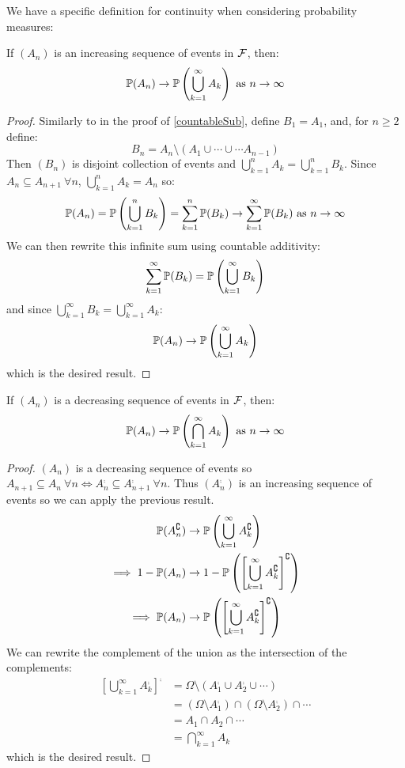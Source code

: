 \documentclass[../main.tex]{subfiles}
\begin{document}
We have a specific definition for continuity when considering probability measures:
\begin{proposition}
  If $(A_n)$ is an increasing sequence of events in $\salg$, then:
  \[
    \P(A_n) \to \P\left(\bigcup_{k = 1}^{\infty} A_k\right) \text{ as $n \to \infty$}
  \]
\end{proposition}
\begin{proof}
  Similarly to in the proof of \cref{countableSub}, define $B_1 = A_1$, and, for $n \geq 2$ define:
  \[
    B_n = A_n \setminus (A_1 \cup \cdots \cup \cdots A_{n - 1})
  \]
  Then $(B_n)$ is disjoint collection of events and $\bigcup_{k = 1}^{n} A_k = \bigcup_{k = 1}^{n} B_k$.
  Since $A_n \subseteq A_{n + 1}\ \forall n$, $\bigcup_{k = 1}^{n} A_k = A_n$ so:
  \[
    \P(A_n) = \P\left(\bigcup_{k = 1}^{n} B_k\right) = \sum_{k = 1}^{n} \P(B_k) \to \sum_{k = 1}^{\infty} \P(B_k) \text{ as $n \to \infty$}
  \]
  We can then rewrite this infinite sum using countable additivity:
  \[
    \sum_{k = 1}^{\infty} \P(B_k) = \P\left(\bigcup_{k = 1}^{\infty} B_k\right)
  \]
  and since $\bigcup_{k = 1}^{\infty} B_k = \bigcup_{k = 1}^{\infty} A_k$:
  \[
    \P(A_n) \to \P\left(\bigcup_{k = 1}^{\infty} A_k\right)
  \]
  which is the desired result.
\end{proof}
\begin{corollary}
  If $(A_n)$ is a decreasing sequence of events in $\salg$, then:
  \[
    \P(A_n) \to \P\left(\bigcap_{k = 1}^{\infty} A_k\right) \text{ as $n \to \infty$}
  \]
\end{corollary}
\begin{proof}
  $(A_n)$ is a decreasing sequence of events so $A_{n + 1} \subseteq A_{n}\ \forall n \iff  A^{\comp}_{n} \subseteq A^{\comp}_{n + 1}\  \forall n$.
  Thus $(A^{\comp}_n)$ is an increasing sequence of events so we can apply the previous result.
  \begin{align*}
    \P(A^{\comp}_n) &\to \P\left(\bigcup_{k = 1}^{\infty} A^{\comp}_k\right) \\
    \implies 1 - \P(A_n) &\to 1 - \P\left(\left[\bigcup_{k = 1}^{\infty} A^{\comp}_k\right]^{\comp}\right) \\
    \implies \P(A_n) &\to \P\left(\left[\bigcup_{k = 1}^{\infty} A^{\comp}_k\right]^{\comp}\right)
  \end{align*}
  We can rewrite the complement of the union as the intersection of the complements:
  \begin{align*}
    \left[\bigcup_{k = 1}^{\infty} A^{\comp}_k\right]^{\comp} &= \Omega \setminus (A^{\comp}_1 \cup A^{\comp}_2 \cup \cdots) \\
                                                   &= (\Omega \setminus A^{\comp}_1) \cap (\Omega \setminus A^{\comp}_2) \cap \cdots \\
                                                   &= A_1 \cap A_2 \cap \cdots \\
                                                   &= \bigcap_{k = 1}^{\infty} A_k
  \end{align*}
  which is the desired result.
\end{proof}
\end{document}
